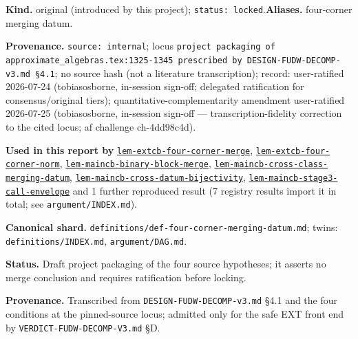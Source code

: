 \begin{defnote}
\textbf{Kind.} original (introduced by this project); \texttt{status: locked}.\quad\textbf{Aliases.} four-corner merging datum.
\par
\textbf{Provenance.} \texttt{source: internal}; locus \texttt{project packaging of approximate\_algebras.\allowbreak{}tex:\allowbreak{}1325-\allowbreak{}1345 prescribed by DESIGN-\allowbreak{}FUDW-\allowbreak{}DECOMP-\allowbreak{}v3.\allowbreak{}md \S{}4.\allowbreak{}1}; no source hash (not a literature transcription); record: user-\allowbreak{}ratified 2026-\allowbreak{}07-\allowbreak{}24 (tobiasosborne,\allowbreak{} in-\allowbreak{}session sign-\allowbreak{}off;\allowbreak{} delegated ratification for consensus/\allowbreak{}original tiers);\allowbreak{} quantitative-\allowbreak{}complementarity amendment user-\allowbreak{}ratified 2026-\allowbreak{}07-\allowbreak{}25 (tobiasosborne,\allowbreak{} in-\allowbreak{}session sign-\allowbreak{}off ---\allowbreak{} transcription-\allowbreak{}fidelity correction to the cited locus;\allowbreak{} af challenge ch-\allowbreak{}4dd98c4d).
\par
\textbf{Used in this report by} \hyperref[lem:extcb-four-corner-merge]{\texttt{lem-\allowbreak{}extcb-\allowbreak{}four-\allowbreak{}corner-\allowbreak{}merge}}, \hyperref[lem:extcb-four-corner-norm]{\texttt{lem-\allowbreak{}extcb-\allowbreak{}four-\allowbreak{}corner-\allowbreak{}norm}}, \hyperref[lem:maincb-binary-block-merge]{\texttt{lem-\allowbreak{}maincb-\allowbreak{}binary-\allowbreak{}block-\allowbreak{}merge}}, \hyperref[lem:maincb-cross-class-merging-datum]{\texttt{lem-\allowbreak{}maincb-\allowbreak{}cross-\allowbreak{}class-\allowbreak{}merging-\allowbreak{}datum}}, \hyperref[lem:maincb-cross-datum-bijectivity]{\texttt{lem-\allowbreak{}maincb-\allowbreak{}cross-\allowbreak{}datum-\allowbreak{}bijectivity}}, \hyperref[lem:maincb-stage3-call-envelope]{\texttt{lem-\allowbreak{}maincb-\allowbreak{}stage3-\allowbreak{}call-\allowbreak{}envelope}} and 1 further reproduced result (7 registry results import it in total; see \texttt{argument/INDEX.md}).
\par
\textbf{Canonical shard.} \texttt{definitions/\allowbreak{}def-\allowbreak{}four-\allowbreak{}corner-\allowbreak{}merging-\allowbreak{}datum.\allowbreak{}md}; twins: \texttt{definitions/INDEX.md}, \texttt{argument/DAG.md}.
\par
\textbf{Status.} Draft project packaging of the four source hypotheses; it asserts
no merge conclusion and requires ratification before locking.

\textbf{Provenance.} Transcribed from \texttt{DESIGN-\allowbreak{}FUDW-\allowbreak{}DECOMP-\allowbreak{}v3.\allowbreak{}md} \S{}4.1 and the four
conditions at the pinned-source locus; admitted only for the safe EXT front
end by \texttt{VERDICT-\allowbreak{}FUDW-\allowbreak{}DECOMP-\allowbreak{}V3.\allowbreak{}md} \S{}D.
\end{defnote}

